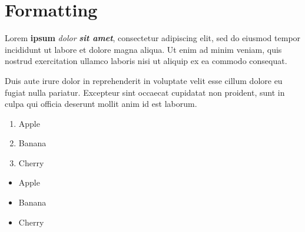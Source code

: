 \chapter{Formatting}

Lorem \textbf{ipsum} \textit{dolor} \textbf{\textit{sit amet}},
consectetur adipiscing elit, sed do eiusmod tempor incididunt
ut labore et dolore magna aliqua. Ut enim ad minim veniam,
quis nostrud exercitation ullamco laboris nisi ut aliquip
ex ea commodo consequat.

Duis aute irure dolor in reprehenderit in voluptate
velit esse cillum dolore eu fugiat nulla pariatur.
Excepteur sint occaecat cupidatat non proident,
sunt in culpa qui officia deserunt mollit anim id est laborum.

\begin{enumerate}
	\item Apple
	\item Banana
	\item Cherry
\end{enumerate}

\begin{itemize}
	\item Apple
	\item Banana
	\item Cherry
\end{itemize}
